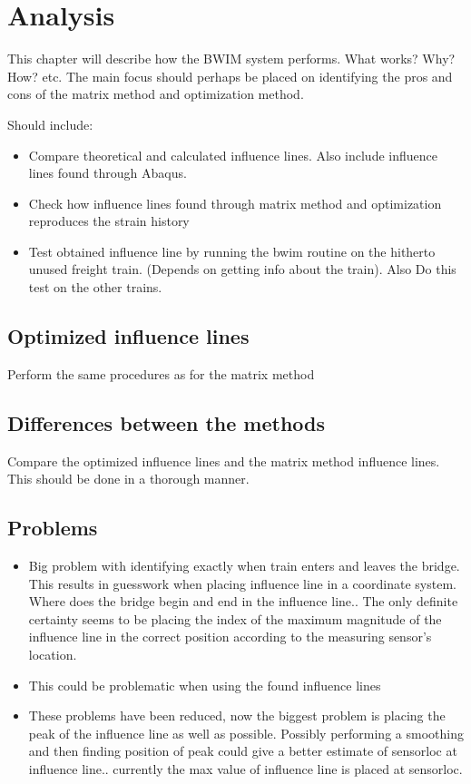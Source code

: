 \section{Analysis}

This chapter will describe how the BWIM system performs. What works? Why? How? etc.
The main focus should perhaps be placed on identifying the pros and cons of the matrix method and optimization method.

Should include:
\begin{itemize}
\item Compare theoretical and calculated influence lines. Also include influence lines found through Abaqus.
\item Check how influence lines found through matrix method and optimization reproduces the strain history
\item Test obtained influence line by running the bwim routine on the hitherto unused freight train. (Depends on getting info about the train). Also Do this test on the other trains.
\end{itemize}



\subsection{Optimized influence lines}
Perform the same procedures as for the matrix method

\subsection{Differences between the methods}
Compare the optimized influence lines and the matrix method influence lines. This should be done in a thorough manner.
\subsection{Problems}
\begin{itemize}
\item Big problem with identifying exactly when train enters and leaves the bridge. This results in guesswork when placing influence line in a coordinate system. Where does the bridge begin and end in the influence line.. The only definite certainty seems to be placing the index of the maximum magnitude of the influence line in the correct position according to the measuring sensor's location.
\item This could be problematic when using the found influence lines
\item These problems have been reduced, now the biggest problem is placing the peak of the influence line as well as possible. Possibly performing a smoothing and then finding position of peak could give a better estimate of sensorloc at influence line.. currently the max value of influence line is placed at sensorloc.
\end{itemize}





